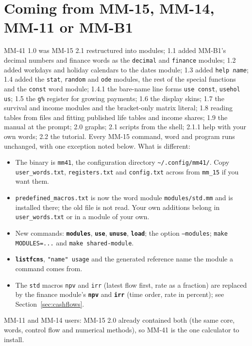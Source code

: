 \documentclass[11pt,letterpaper]{article}
\newcommand{\code}[1]{\texttt{#1}}
\newcommand{\cmd}[1]{\texttt{\textbf{#1}}}
\begin{document}
\clearpage
\section{Coming from MM-15, MM-14, MM-11 or MM-B1}
\label{app:changes}

MM-41 1.0 was MM-15 2.1 restructured into modules; 1.1 added MM-B1's decimal numbers and finance words as the \code{decimal} and \code{finance} modules; 1.2 added workdays and holiday calendars to the dates module; 1.3 added \code{help \emph{name}}; 1.4 added the \code{stat}, \code{random} and \code{ode} modules, the rest of the special functions and the \code{const} word module; 1.4.1 the bare-name line forms \code{use const}, \code{usehol us}; 1.5 the \code{g\%} register for growing payments; 1.6 the display skins; 1.7 the survival and income modules and the bracket-only matrix literal; 1.8 reading tables from files and fitting published life tables and income shares; 1.9 the manual at the prompt; 2.0 graphs; 2.1 scripts from the shell; 2.1.1 help with your own words; 2.2 the tutorial. Every MM-15 command, word and program runs unchanged, with one exception noted below. What is different:
\begin{itemize}
  \item The binary is \code{mm41}, the configuration directory \code{\textasciitilde/.config/mm41/}. Copy \code{user\_words.txt}, \code{registers.txt} and \code{config.txt} across from \code{mm\_15} if you want them.
  \item \code{predefined\_macros.txt} is now the word module \code{modules/std.mm} and is installed there; the old file is not read. Your own additions belong in \code{user\_words.txt} or in a module of your own.
  \item New commands: \cmd{modules}, \cmd{use}, \cmd{unuse}, \cmd{load}; the option \code{--modules}; \code{make MODULES=...} and \code{make shared-module}.
  \item \cmd{listfcns}, \code{"name" usage} and the generated reference name the module a command comes from.
  \item The \code{std} macros \code{npv} and \code{irr} (latest flow first, rate as a fraction) are replaced by the finance module's \cmd{npv} and \cmd{irr} (time order, rate in percent); see Section~\ref{sec:cashflows}.
\end{itemize}
MM-11 and MM-14 users: MM-15 2.0 already contained both (the same core, words, control flow and numerical methods), so MM-41 is the one calculator to install.
\end{document}
